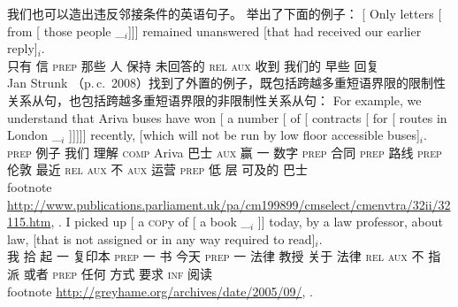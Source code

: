 \noindent
我们也可以造出违反邻接条件的英语句子。 \citet[]{Uszkoreit90a}举出了下面的例子：
\ea
\gll {}[ Only letters [ from          [ those people \_$_i$]]] remained unanswered [that had received our earlier reply]$_i$.\\
     {}          只有   信     {}        \textsc{prep} {}        那些   人     {}        保持      未回答的    \spacebr\textsc{rel} \textsc{aux} 收到 我们的 早些 回复\\
\z
%
Jan Strunk （p.\,c.\, 2008）找到了外置的例子，既包括跨越多重短语界限的限制性关系从句，也包括跨越多重短语界限的非限制性关系从句：
\eal
\ex 
\gll For example, we understand that Ariva buses have won [ a number [ of [ contracts [ for [ routes in London \_$_i$ ]]]]] recently, [which will not be run by low floor accessible buses]$_i$.\\
     \textsc{prep} 例子 我们 理解 \textsc{comp} Ariva 巴士 \textsc{aux} 赢 {} 一 数字 {} \textsc{prep} {} 合同 {} \textsc{prep} {} 路线 \textsc{prep} 伦敦 {} {} 最近 \spacebr\textsc{rel} \textsc{aux} 不 \textsc{aux} 运营 \textsc{prep} 低 层 可及的 巴士\\
footnote{%
\url{http://www.publications.parliament.uk/pa/cm199899/cmselect/cmenvtra/32ii/32115.htm},
.
}
\ex 
\gll I picked up [ a \textsc{cop}y of [ a book \_$_i$ ]] today, by a law professor, about law, [that is not assigned or in any way required to read]$_i$.\\
我 拾 起 {} 一 复印本 \textsc{prep} {} 一 书 {} {} 今天 \textsc{prep} 一 法律 教授 关于 法律 \spacebr\textsc{rel} \textsc{aux} 不 指派 或者 \textsc{prep} 任何 方式 要求 \textsc{inf} 阅读\\
footnote{%
\url{http://greyhame.org/archives/date/2005/09/}, .
}
